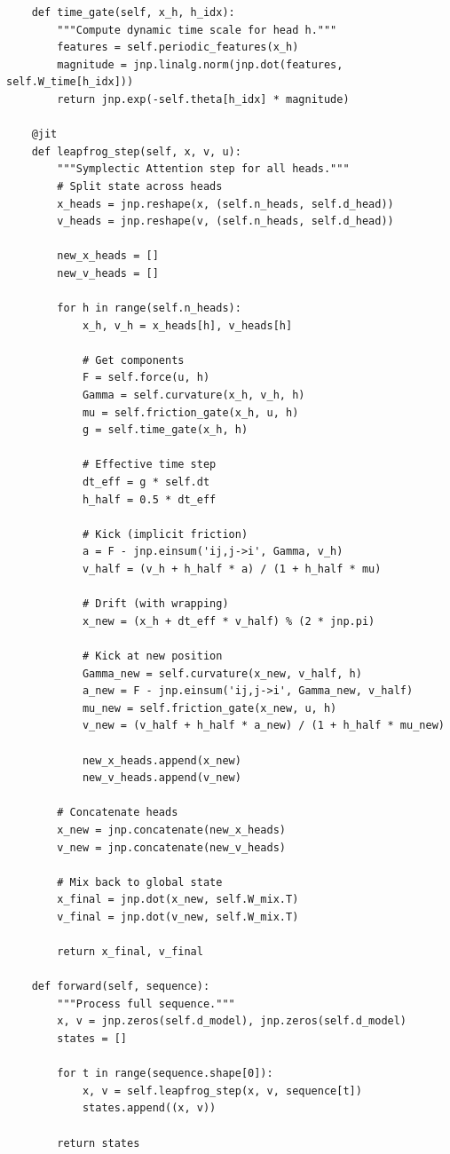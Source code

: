 \documentclass[12pt,letterpaper,twoside]{article}
\begin{document}
\begin{verbatim}
    def time_gate(self, x_h, h_idx):
        """Compute dynamic time scale for head h."""
        features = self.periodic_features(x_h)
        magnitude = jnp.linalg.norm(jnp.dot(features, self.W_time[h_idx]))
        return jnp.exp(-self.theta[h_idx] * magnitude)
    
    @jit
    def leapfrog_step(self, x, v, u):
        """Symplectic Attention step for all heads."""
        # Split state across heads
        x_heads = jnp.reshape(x, (self.n_heads, self.d_head))
        v_heads = jnp.reshape(v, (self.n_heads, self.d_head))
        
        new_x_heads = []
        new_v_heads = []
        
        for h in range(self.n_heads):
            x_h, v_h = x_heads[h], v_heads[h]
            
            # Get components
            F = self.force(u, h)
            Gamma = self.curvature(x_h, v_h, h)
            mu = self.friction_gate(x_h, u, h)
            g = self.time_gate(x_h, h)
            
            # Effective time step
            dt_eff = g * self.dt
            h_half = 0.5 * dt_eff
            
            # Kick (implicit friction)
            a = F - jnp.einsum('ij,j->i', Gamma, v_h)
            v_half = (v_h + h_half * a) / (1 + h_half * mu)
            
            # Drift (with wrapping)
            x_new = (x_h + dt_eff * v_half) % (2 * jnp.pi)
            
            # Kick at new position
            Gamma_new = self.curvature(x_new, v_half, h)
            a_new = F - jnp.einsum('ij,j->i', Gamma_new, v_half)
            mu_new = self.friction_gate(x_new, u, h)
            v_new = (v_half + h_half * a_new) / (1 + h_half * mu_new)
            
            new_x_heads.append(x_new)
            new_v_heads.append(v_new)
        
        # Concatenate heads
        x_new = jnp.concatenate(new_x_heads)
        v_new = jnp.concatenate(new_v_heads)
        
        # Mix back to global state
        x_final = jnp.dot(x_new, self.W_mix.T)
        v_final = jnp.dot(v_new, self.W_mix.T)
        
        return x_final, v_final
    
    def forward(self, sequence):
        """Process full sequence."""
        x, v = jnp.zeros(self.d_model), jnp.zeros(self.d_model)
        states = []
        
        for t in range(sequence.shape[0]):
            x, v = self.leapfrog_step(x, v, sequence[t])
            states.append((x, v))
        
        return states
\end{verbatim}
\end{document}
